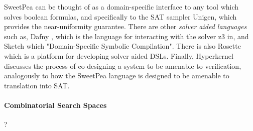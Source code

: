 SweetPea can be thought of as a domain-specific interface to any tool which solves boolean formulas, and specifically to the SAT sampler Unigen, which provides the near-uniformity guarantee. There are other \emph{solver aided languages} such as, Dafny \cite{leino2013developing}, which is the language for interacting with the solver z3 in, and Sketch \cite{bodik2017domain} which "Domain-Specific Symbolic Compilation". There is also Rosette \cite{torlak2014lightweight} which is a platform for developing solver aided DSLs. Finally, Hyperkernel \cite{nelson2017hyperkernel} discusses the process of co-designing a system to be amenable to verification, analogously to how the SweetPea language is designed to be amenable to translation into SAT.


\paragraph*{Combinatorial Search Spaces}
?

\cite{meel2016constrained}

